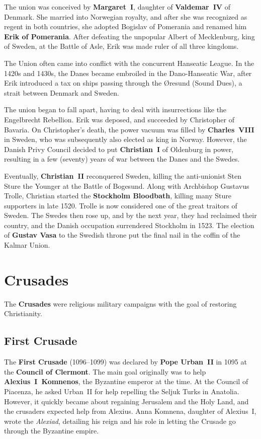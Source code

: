 The union was conceived by \textbf{Margaret~I}, daughter of \textbf{Valdemar~IV} of Denmark.
She married into Norwegian royalty, and after she was recognized as regent in both countries,
she adopted Bogislav of Pomerania and renamed him \textbf{Erik of Pomerania}.
After defeating the unpopular Albert of Mecklenburg, king of Sweden, at the Battle of Asle,
Erik was made ruler of all three kingdoms.

The Union often came into conflict with the concurrent Hanseatic League.
In the 1420s and 1430s, the Danes became embroiled in the Dano-Hanseatic War,
after Erik introduced a tax on ships passing through the \O{}resund (Sound Dues), a strait between Denmark and Sweden.

The union began to fall apart, having to deal with insurrections like the Engelbrecht Rebellion.
Erik was deposed, and succeeded by Christopher of Bavaria.
On Christopher's death, the power vacuum was filled by \textbf{Charles~VIII} in Sweden,
who was subsequently also elected as king in Norway.
However, the Danish Privy Council decided to put \textbf{Christian~I} of Oldenburg in power,
resulting in a few (seventy) years of war between the Danes and the Swedes.

Eventually, \textbf{Christian~II} reconquered Sweden,
killing the anti-unionist Sten Sture the Younger at the Battle of Bogesund.
Along with Archbishop Gustavus Trolle,
Christian started the \textbf{Stockholm Bloodbath}, killing many Sture supporters in late 1520.
Trolle is now considered one of the great traitors of Sweden.
The Swedes then rose up, and by the next year,
they had reclaimed their country, and the Danish occupation surrendered Stockholm in 1523.
The election of \textbf{Gustav Vasa} to the Swedish throne put the final nail in the coffin of the Kalmar Union.

\section{Crusades}

The \textbf{Crusades} were religious military campaigns with the goal of restoring Christianity.

\subsection*{First Crusade}

The \textbf{First Crusade} (1096--1099) was declared by \textbf{Pope Urban~II}
in 1095 at the \textbf{Council of Clermont}.
The main goal originally was to help \textbf{Alexius~I~Komnenos}, the Byzantine emperor at the time.
At the Council of Piacenza, he asked Urban~II for help repelling the Seljuk Turks in Anatolia.
However, it quickly became about regaining Jerusalem and the Holy Land,
and the crusaders expected help from Alexius.
Anna Komnena, daughter of Alexius~I, wrote the \textit{Alexiad},
detailing his reign and his role in letting the Crusade go through the Byzantine empire.

